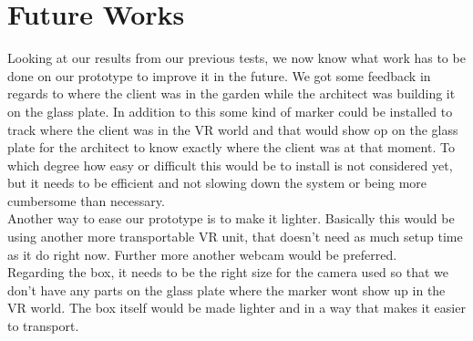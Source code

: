 \chapter{Future Works}
Looking at our results from our previous tests, we now know what work has to be done on our prototype to improve it in the future. We got some feedback in regards to where the client was in the garden while the architect was building it on the glass plate. In addition to this some kind of marker could be installed to track where the client was in the VR world and that would show op on the glass plate for the architect to know exactly where the client was at that moment. To which degree how easy or difficult this would be to install is not considered yet, but it needs to be efficient and not slowing down the system or being more cumbersome than necessary.\\

Another way to ease our prototype is to make it lighter. Basically this would be using another more transportable VR unit, that doesn't need as much setup time as it do right now. Further more another webcam would be preferred.\\
Regarding the box, it needs to be the right size for the camera used so that we don't have any parts on the glass plate where the marker wont show up in the VR world. The box itself would be made lighter and in a way that makes it easier to transport.\\

